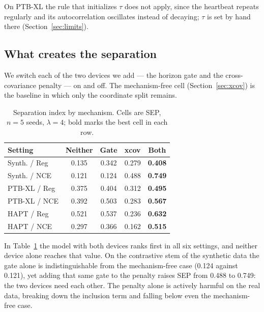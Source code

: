 On PTB-XL the rule that initializes $\tau$ does not apply, since the heartbeat repeats regularly and its autocorrelation oscillates instead of decaying; $\tau$ is set by hand there (Section~\ref{sec:limits}).

\subsection{What creates the separation}
\label{sec:ablation}

We switch each of the two devices we add --- the horizon gate and the cross-covariance penalty --- on and off. The mechanism-free cell (Section~\ref{sec:xcov}) is the baseline in which only the coordinate split remains.

\begin{table}[!htb]
\begin{minipage}[t]{0.53\textwidth}
\caption{Separation index by mechanism. Cells are SEP, $n=5$ seeds, $\lambda=4$; bold marks the best cell in each row.}
\label{tab:ablation}
\centering
\footnotesize
\setlength{\tabcolsep}{3pt}
\begin{tabular}{lcccc}
\hline
Setting & Neither & Gate & xcov & \textbf{Both} \\
\hline
Synth. / Reg & 0.135 & 0.342 & 0.279 & \textbf{0.408} \\
Synth. / NCE & 0.121 & 0.124 & 0.488 & \textbf{0.749} \\
PTB-XL / Reg & 0.375 & 0.404 & 0.312 & \textbf{0.495} \\
PTB-XL / NCE & 0.392 & 0.503 & 0.283 & \textbf{0.567} \\
HAPT / Reg & 0.521 & 0.537 & 0.236 & \textbf{0.632} \\
HAPT / NCE & 0.297 & 0.366 & 0.162 & \textbf{0.515} \\
\hline
\end{tabular}
\end{minipage}\hfill
\begin{minipage}[t]{0.44\textwidth}

\end{minipage}
\end{table}

In Table~\ref{tab:ablation} the model with both devices ranks first in all six settings, and neither device alone reaches that value. On the contrastive stem of the synthetic data the gate alone is indistinguishable from the mechanism-free case (0.124 against 0.121), yet adding that same gate to the penalty raises SEP from 0.488 to 0.749: the two devices need each other. The penalty alone is actively harmful on the real data, breaking down the inclusion term and falling below even the mechanism-free case.

